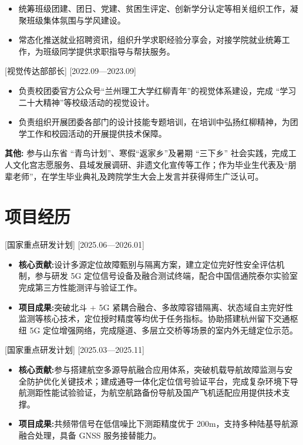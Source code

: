 \documentclass{resume}
\begin{document}
\begin{itemize}
	\item 统筹班级团建、团日、党建、贫困生评定、创新学分认定等相关组织工作，凝聚班级集体氛围与学风建设。
	\item 常态化推送就业招聘资讯，组织升学求职经验分享会，对接学院就业统筹工作，为班级同学提供求职指导与帮扶服务。
\end{itemize}

[视觉传达部部长]
[2022.09—2023.09] 

\begin{itemize}
	\item 负责校团委官方公众号“兰州理工大学红柳青年”的视觉体系建设，完成 “学习二十大精神”等校级活动的视觉设计。
	\item 负责组织开展团委各部门的设计技能专题培训，在培训中弘扬红柳精神，为团学工作和校园活动的开展提供技术保障。
\end{itemize}

\textbf{其他:} 参与山东省 “青鸟计划”、寒假“返家乡”及暑期 “三下乡” 社会实践，完成工人文化宫志愿服务、县域发展调研、非遗文化宣传等工作；作为毕业生代表及“朋辈老师”，在学生毕业典礼及跨院学生大会上发言并获得师生广泛认可。


\section{项目经历}

[国家重点研发计划]
[2025.06—2026.01] 

\begin{itemize}
	\item \textbf{核心贡献:}设计多源定位故障甄别与隔离方案，建立定位完好性安全评估机制，参与研发 5G 定位信号设备及融合测试终端，配合中国信通院泰尔实验室完成第三方性能测评与验证工作。
	\item \textbf{项目成果:}突破北斗 + 5G 紧耦合融合、多故障容错隔离、状态域自主完好性监测等核心技术，定位授时精度等均优于任务指标。协助搭建杭州留下交通枢纽 5G 定位增强网络，完成隧道、多层立交桥等场景的室内外无缝定位示范。
\end{itemize}


[国家重点研发计划]
[2025.03—2025.11] 

\begin{itemize}
  \item \textbf{核心贡献:}参与搭建航空多源导航融合应用体系，突破机载导航故障监测与安全防护优化关键技术；建成通导一体化定位信号验证平台，完成复杂环境下导航测距性能试验验证，为航空航路备份导航及国产飞机适配应用提供技术支撑。
  \item \textbf{项目成果:}共频带信号在低信噪比下测距精度优于 200m，支持多种陆基导航源融合处理，具备 GNSS 服务接替能力。
\end{itemize}
\end{document}
